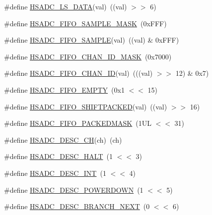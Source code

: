 \begin{DoxyCompactItemize}
\#define \hyperlink{group___h_s_a_d_c__18_x_x__43_x_x_ga59cfae9793b32fc984aa56b25e579e85}{H\+S\+A\+D\+C\+\_\+\+L\+S\+\_\+\+D\+A\+TA}(val)~((val) $>$$>$ 6)
\item 
\#define \hyperlink{group___h_s_a_d_c__18_x_x__43_x_x_ga5ae1350581db3acfa2450f482f64a14d}{H\+S\+A\+D\+C\+\_\+\+F\+I\+F\+O\+\_\+\+S\+A\+M\+P\+L\+E\+\_\+\+M\+A\+SK}~(0x\+F\+F\+F)
\item 
\#define \hyperlink{group___h_s_a_d_c__18_x_x__43_x_x_ga4e9d547e690f73b5e1cef272e5272239}{H\+S\+A\+D\+C\+\_\+\+F\+I\+F\+O\+\_\+\+S\+A\+M\+P\+LE}(val)~((val) \& 0x\+F\+F\+F)
\item 
\#define \hyperlink{group___h_s_a_d_c__18_x_x__43_x_x_ga46dfa5dab0fc08a4e9126be14eec1f1c}{H\+S\+A\+D\+C\+\_\+\+F\+I\+F\+O\+\_\+\+C\+H\+A\+N\+\_\+\+I\+D\+\_\+\+M\+A\+SK}~(0x7000)
\item 
\#define \hyperlink{group___h_s_a_d_c__18_x_x__43_x_x_gaa90d96f985440d9588a1b0a3d3b30d9e}{H\+S\+A\+D\+C\+\_\+\+F\+I\+F\+O\+\_\+\+C\+H\+A\+N\+\_\+\+ID}(val)~(((val) $>$$>$ 12) \& 0x7)
\item 
\#define \hyperlink{group___h_s_a_d_c__18_x_x__43_x_x_ga024359046ed5aea283f5ca303828ebaf}{H\+S\+A\+D\+C\+\_\+\+F\+I\+F\+O\+\_\+\+E\+M\+P\+TY}~(0x1 $<$$<$ 15)
\item 
\#define \hyperlink{group___h_s_a_d_c__18_x_x__43_x_x_ga59b2c13550ce54537ddba69cec51bd0b}{H\+S\+A\+D\+C\+\_\+\+F\+I\+F\+O\+\_\+\+S\+H\+I\+F\+T\+P\+A\+C\+K\+ED}(val)~((val) $>$$>$ 16)
\item 
\#define \hyperlink{group___h_s_a_d_c__18_x_x__43_x_x_ga135c335cef689d7ecc14af1f5bd0ac6b}{H\+S\+A\+D\+C\+\_\+\+F\+I\+F\+O\+\_\+\+P\+A\+C\+K\+E\+D\+M\+A\+SK}~(1\+U\+L $<$$<$ 31)
\item 
\#define \hyperlink{group___h_s_a_d_c__18_x_x__43_x_x_ga02a0ec797250b260c4ffa4e52e256a44}{H\+S\+A\+D\+C\+\_\+\+D\+E\+S\+C\+\_\+\+CH}(ch)~(ch)
\item 
\#define \hyperlink{group___h_s_a_d_c__18_x_x__43_x_x_gaba66d1c1c7ce5508696f9da464b680c9}{H\+S\+A\+D\+C\+\_\+\+D\+E\+S\+C\+\_\+\+H\+A\+LT}~(1 $<$$<$ 3)
\item 
\#define \hyperlink{group___h_s_a_d_c__18_x_x__43_x_x_gade13fb1864987d1b1d8054ae6f861167}{H\+S\+A\+D\+C\+\_\+\+D\+E\+S\+C\+\_\+\+I\+NT}~(1 $<$$<$ 4)
\item 
\#define \hyperlink{group___h_s_a_d_c__18_x_x__43_x_x_ga5cb818c7f3deae6a0bd626acde3f4278}{H\+S\+A\+D\+C\+\_\+\+D\+E\+S\+C\+\_\+\+P\+O\+W\+E\+R\+D\+O\+WN}~(1 $<$$<$ 5)
\item 
\#define \hyperlink{group___h_s_a_d_c__18_x_x__43_x_x_gace04d08e17d8ef4aea5dcdd739977f52}{H\+S\+A\+D\+C\+\_\+\+D\+E\+S\+C\+\_\+\+B\+R\+A\+N\+C\+H\+\_\+\+N\+E\+XT}~(0 $<$$<$ 6)
$$
\end{DoxyCompactItemize}
